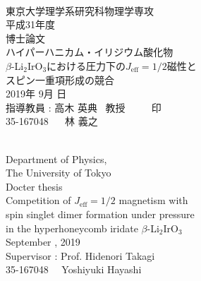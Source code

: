 \documentclass[11pt,a4paper]{report}
\begin{document}
\begin{titlepage}
\begin{center}
~\\
\vspace{40truept}
{\LARGE 東京大学理学系研究科物理学専攻}\\
\vspace{20truept}
{\LARGE 平成31年度}\\
\vspace{20truept}
{\LARGE 博士論文}\\
\vspace{60truept}
{\Huge ハイパーハニカム・イリジウム酸化物}\\
\vspace{7truept}
{\Huge $\beta$-Li$_2$IrO$_3$における圧力下の$J_\mathrm{eff} = 1/2$磁性と}\\
\vspace{7truept}
{\Huge スピン一重項形成の競合}\\
\vspace{100truept}
{\LARGE 2019年 9月 日}\\
\vspace{20truept}
{\LARGE 指導教員 : 高木 英典 ~教授 ~~~~ 印}\\
\vspace{50truept}
{\LARGE 35-167048 ~~ 林 義之}
\end{center}
\end{titlepage}

\begin{titlepage}
\begin{center}
~\\
\vspace{40truept}
{\LARGE Department of Physics,}\\
\vspace{20truept}
{\LARGE  The University of Tokyo}\\
\vspace{20truept}
{\LARGE Docter thesis}\\
\vspace{60truept}
{\Huge Competition of $J_\mathrm{eff} = 1/2$ magnetism with}\\
\vspace{7truept}
{\Huge spin singlet dimer formation under pressure}\\
\vspace{7truept}
{\Huge in the hyperhoneycomb iridate $\beta$-Li$_2$IrO$_3$}\\
\vspace{100truept}
{\LARGE September , 2019}\\
\vspace{20truept}
{\LARGE Supervisor : Prof. Hidenori Takagi}\\
\vspace{50truept}
{\LARGE 35-167048 ~~Yoshiyuki Hayashi}
\end{center}
\end{titlepage}

\restoregeometry
\tableofcontents

%



%

%

%

%

%

\printbibliography[title=Reference]
\end{document}
